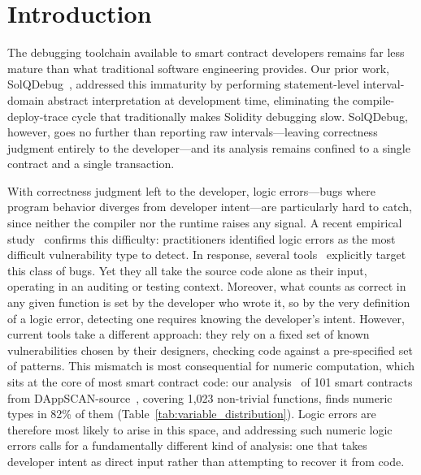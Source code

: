 \documentclass[pdflatex,sn-basic]{sn-jnl}%
\theoremstyle{thmstyleone}%
\theoremstyle{thmstyletwo}%
\theoremstyle{thmstylethree}%
\begin{document}
\maketitle

\section{Introduction}

The debugging toolchain available to smart contract developers remains far less mature than what traditional software engineering provides.
Our prior work, SolQDebug~\citep{solqdebug}, addressed this immaturity by performing statement-level interval-domain abstract interpretation at development time, eliminating the compile-deploy-trace cycle that traditionally makes Solidity debugging slow.
SolQDebug, however, goes no further than reporting raw intervals---leaving correctness judgment entirely to the developer---and its analysis remains confined to a single contract and a single transaction.

With correctness judgment left to the developer, logic errors---bugs where program behavior diverges from developer intent---are particularly hard to catch, since neither the compiler nor the runtime raises any signal.
A recent empirical study~\citep{defisecurity} confirms this difficulty: practitioners identified logic errors as the most difficult vulnerability type to detect.
In response, several tools~\citep{numscout, gptscan, accountingerrors} explicitly target this class of bugs.
Yet they all take the source code alone as their input, operating in an auditing or testing context.
Moreover, what counts as correct in any given function is set by the developer who wrote it, so by the very definition of a logic error, detecting one requires knowing the developer's intent.
However, current tools take a different approach: they rely on a fixed set of known vulnerabilities chosen by their designers, checking code against a pre-specified set of patterns.
This mismatch is most consequential for numeric computation, which sits at the core of most smart contract code: our analysis~\citep{dappscananalysis} of 101 smart contracts from DAppSCAN-source~\citep{dappscan}, covering 1,023 non-trivial functions, finds numeric types in 82\% of them (Table~\ref{tab:variable_distribution}).
Logic errors are therefore most likely to arise in this space, and addressing such numeric logic errors calls for a fundamentally different kind of analysis: one that takes developer intent as direct input rather than attempting to recover it from code.
\end{document}
